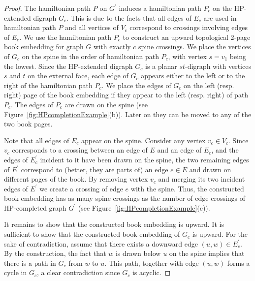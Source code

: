 \documentclass{myllncs-mixalis}
\begin{document}
\begin{proof}
 The hamiltonian path $P$ on $G^\prime$ induces a hamiltonian path
 $P_c$ on the HP-extended digraph $G_c$. This is due to the facts that all
 edges of $E_c$ are used in hamiltonian path $P$ and all vertices of
 $V_c$ correspond to crossings involving edges of $E_c$. We  use
 the hamiltonian path $P_c$ to construct an upward topological
 2-page book embedding for graph $G$ with exactly $c$ spine
 crossings. We place the vertices of $G_c$ on the spine in the order
 of hamiltonian path $P_c$, with vertex $s=v_1$ being the lowest.
 Since the HP-extended digraph $G_c$ is a planar $st$-digraph with vertices $s$ and $t$ on the external face,
 each edge of $G_c$
 appears either to the left or to the right of the hamiltonian path
 $P_c$.
 We place the  edges of $G_c$  on the left (resp. right) page of the book embedding if
 they appear to the left (resp. right) of path $P_c$. The edges of
 $P_c$ are drawn on the spine (see Figure~\ref{fig:HPcompletionExample}(b)).
 Later on they can be moved to any of
 the two book pages.

 Note that all edges of $E_c$ appear on the spine. Consider any vertex  $v_c \in V_c$.
 Since $v_c$ corresponds to a crossing between an edge of $E$ and an edge of
 $E_c$, and the edges of $E_c^\prime$ incident to it have been drawn
 on the spine, the two remaining edges of $E^\prime$ correspond to (better, they are parts of) an edge $e \in E$
 and  drawn on
 different pages of the book.   By removing vertex $v_c$ and merging
 its two incident edges of $E^\prime$ we create a crossing of edge
 $e$ with the spine. Thus, the constructed book embedding has as
 many spine crossings as the number of edge crossings of
 HP-completed graph $G^\prime$ (see Figure~\ref{fig:HPcompletionExample}(c)).

 It remains to show that the
 constructed book embedding is upward. It is sufficient to show that the constructed book
 embedding of $G_c$ is upward. For the sake of contradiction, assume
 that there exists a downward edge $(u,w) \in E_c^\prime$. By the construction, the fact
 that $w$ is drawn below $u$ on the spine implies that there is a
 path in $G_c$ from $w$ to $u$. This path, together with edge
 $(u,w)$ forms a cycle in $G_c$, a clear contradiction since $G_c$
 is acyclic.


\end{proof}
\end{document}
